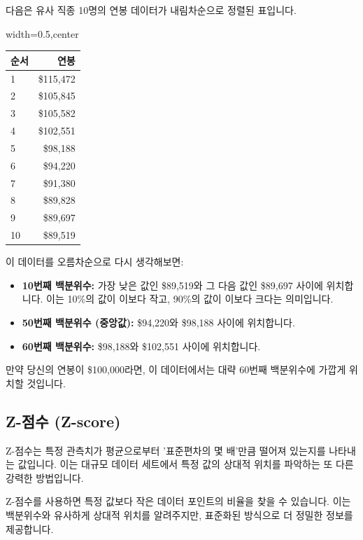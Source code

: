 \documentclass[11pt,a4paper]{book}
\theoremstyle{definition}
\begin{document}
\begin{examplebox}[title=백분위수 계산 예시: 연봉 데이터]
다음은 유사 직종 10명의 연봉 데이터가 내림차순으로 정렬된 표입니다.

\begin{adjustbox}{width=0.5\textwidth,center}
\begin{tabular}{lr}
\toprule
\textbf{순서} & \textbf{연봉} \\
\midrule
1 & \$115,472 \\
2 & \$105,845 \\
3 & \$105,582 \\
4 & \$102,551 \\
5 & \$98,188 \\
6 & \$94,220 \\
7 & \$91,380 \\
8 & \$89,828 \\
9 & \$89,697 \\
10 & \$89,519 \\
\bottomrule
\end{tabular}
\end{adjustbox}

이 데이터를 오름차순으로 다시 생각해보면:
\begin{itemize}
    \item \textbf{10번째 백분위수:} 가장 낮은 값인 \$89,519와 그 다음 값인 \$89,697 사이에 위치합니다. 이는 10\%의 값이 이보다 작고, 90\%의 값이 이보다 크다는 의미입니다.
    \item \textbf{50번째 백분위수 (중앙값):} \$94,220와 \$98,188 사이에 위치합니다.
    \item \textbf{60번째 백분위수:} \$98,188와 \$102,551 사이에 위치합니다.
\end{itemize}
만약 당신의 연봉이 \$100,000라면, 이 데이터에서는 대략 60번째 백분위수에 가깝게 위치할 것입니다.
\end{examplebox}


\subsection{Z-점수 (Z-score)}

\begin{summarybox}[title=Z-점수 핵심 요약]
Z-점수는 특정 관측치가 평균으로부터 '표준편차의 몇 배'만큼 떨어져 있는지를 나타내는 값입니다. 이는 대규모 데이터 세트에서 특정 값의 상대적 위치를 파악하는 또 다른 강력한 방법입니다.
\end{summarybox}

Z-점수를 사용하면 특정 값보다 작은 데이터 포인트의 비율을 찾을 수 있습니다. 이는 백분위수와 유사하게 상대적 위치를 알려주지만, 표준화된 방식으로 더 정밀한 정보를 제공합니다.
\end{document}
